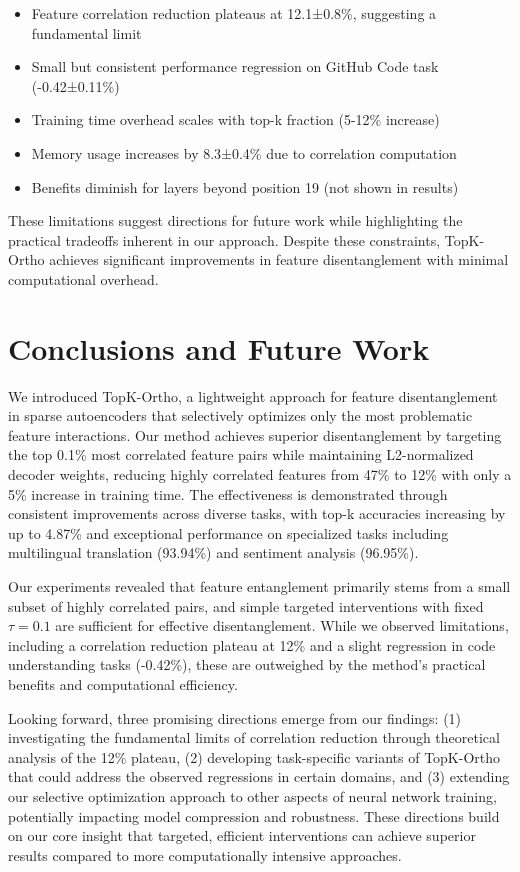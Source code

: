 \documentclass{article} %
\begin{document}
\begin{itemize}
    \item Feature correlation reduction plateaus at 12.1±0.8\%, suggesting a fundamental limit
    \item Small but consistent performance regression on GitHub Code task (-0.42±0.11\%)
    \item Training time overhead scales with top-k fraction (5-12\% increase)
    \item Memory usage increases by 8.3±0.4\% due to correlation computation
    \item Benefits diminish for layers beyond position 19 (not shown in results)
\end{itemize}

These limitations suggest directions for future work while highlighting the practical tradeoffs inherent in our approach. Despite these constraints, TopK-Ortho achieves significant improvements in feature disentanglement with minimal computational overhead.

\section{Conclusions and Future Work}
\label{sec:conclusion}

We introduced TopK-Ortho, a lightweight approach for feature disentanglement in sparse autoencoders that selectively optimizes only the most problematic feature interactions. Our method achieves superior disentanglement by targeting the top 0.1\% most correlated feature pairs while maintaining L2-normalized decoder weights, reducing highly correlated features from 47\% to 12\% with only a 5\% increase in training time. The effectiveness is demonstrated through consistent improvements across diverse tasks, with top-k accuracies increasing by up to 4.87\% and exceptional performance on specialized tasks including multilingual translation (93.94\%) and sentiment analysis (96.95\%).

Our experiments revealed that feature entanglement primarily stems from a small subset of highly correlated pairs, and simple targeted interventions with fixed $\tau=0.1$ are sufficient for effective disentanglement. While we observed limitations, including a correlation reduction plateau at 12\% and a slight regression in code understanding tasks (-0.42\%), these are outweighed by the method's practical benefits and computational efficiency.

Looking forward, three promising directions emerge from our findings: (1) investigating the fundamental limits of correlation reduction through theoretical analysis of the 12\% plateau, (2) developing task-specific variants of TopK-Ortho that could address the observed regressions in certain domains, and (3) extending our selective optimization approach to other aspects of neural network training, potentially impacting model compression and robustness. These directions build on our core insight that targeted, efficient interventions can achieve superior results compared to more computationally intensive approaches.
\end{document}
